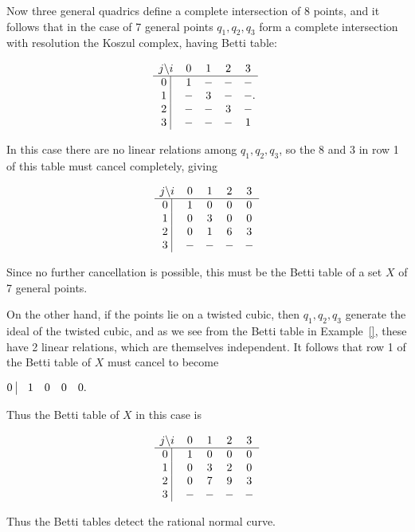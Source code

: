 \begin{example}
Now three general quadrics define a complete intersection of 8 points, and it follows that in the case of 7 general points $q_{1},q_{2},q_{3}$ form a complete intersection with resolution the Koszul complex, having Betti table:
\begin{small}
$$
\begin{matrix}
j \backslash i &0&1&2&3\\ \hline
\text{0 }\vline &1&-&-&-\\
\text{1 }\vline &-&3&-&-\\
\text{2 }\vline &-&-&3&-\\
\text{3 }\vline &-&-&-&1\\
\end{matrix}.
$$
\end{small}
In this case there are no linear relations among $q_{1},q_{2},q_{3}$, so the 8 and 3 in row 1 of this table must 
cancel completely, giving
\begin{small}
$$
\begin{matrix}
j \backslash i &0&1&2&3\\ \hline
\text{0 }\vline &1&0&0&0\\
\text{1 }\vline &0&3&0&0\\
\text{2 }\vline &0&1&6&3\\
\text{3 }\vline &-&-&-&-\\
\end{matrix}
$$
\end{small}
Since no further cancellation is possible, this must be the Betti table of a  set $X$ of 7 general points.

On the other hand, if the points lie on a twisted cubic, then $q_{1}, q_{2}, q_{3}$ generate the ideal of the twisted cubic, and as we  see from the Betti table in Example~\ref{}, these have 2 linear relations, which are themselves independent. It follows that row 1 of the Betti table of $X$ must cancel to become 
\begin{small}
 $
\begin{matrix}
\text{0 }\vline &1&0&0&0\\
\end{matrix}.
$
\end{small}
Thus the Betti table of $X$ in this case is
\begin{small}
$$
\begin{matrix}
j \backslash i &0&1&2&3\\ \hline
\text{0 }\vline &1&0&0&0\\
\text{1 }\vline &0&3&2&0\\
\text{2 }\vline &0&7&9&3\\
\text{3 }\vline &-&-&-&-\\
\end{matrix}
$$
\end{small}

\end{example}
Thus the Betti tables detect the rational normal curve.

